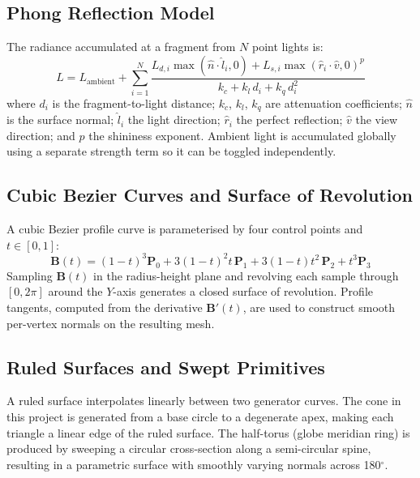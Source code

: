 \documentclass[12pt, a4paper]{article}
\begin{document}
\subsection{Phong Reflection Model}

The radiance accumulated at a fragment from $N$ point lights is:
\begin{equation}
    L = L_{\text{ambient}} + \sum_{i=1}^{N} \frac{L_{d,i}\max(\hat{n}\cdot\hat{l}_i,0) + L_{s,i}\max(\hat{r}_i\cdot\hat{v},0)^{p}}
        {k_c + k_l\,d_i + k_q\,d_i^2}
    \label{eq:phong}
\end{equation}
where $d_i$ is the fragment-to-light distance; $k_c$, $k_l$, $k_q$ are attenuation coefficients; $\hat{n}$ is the surface normal; $\hat{l}_i$ the light direction; $\hat{r}_i$ the perfect reflection; $\hat{v}$ the view direction; and $p$ the shininess exponent. Ambient light is accumulated globally using a separate strength term so it can be toggled independently.

\subsection{Cubic Bezier Curves and Surface of Revolution}

A cubic Bezier profile curve is parameterised by four control points and $t\in[0,1]$:
\begin{equation}
    \mathbf{B}(t) = (1{-}t)^3\mathbf{P}_0 + 3(1{-}t)^2t\,\mathbf{P}_1
                    + 3(1{-}t)t^2\,\mathbf{P}_2 + t^3\mathbf{P}_3
    \label{eq:bezier}
\end{equation}
Sampling $\mathbf{B}(t)$ in the radius-height plane and revolving each sample through $[0,2\pi]$ around the $Y$-axis generates a closed surface of revolution. Profile tangents, computed from the derivative $\mathbf{B}'(t)$, are used to construct smooth per-vertex normals on the resulting mesh.

\subsection{Ruled Surfaces and Swept Primitives}

A ruled surface interpolates linearly between two generator curves. The cone in this project is generated from a base circle to a degenerate apex, making each triangle a linear edge of the ruled surface. The half-torus (globe meridian ring) is produced by sweeping a circular cross-section along a semi-circular spine, resulting in a parametric surface with smoothly varying normals across 180$^\circ$.
\end{document}
